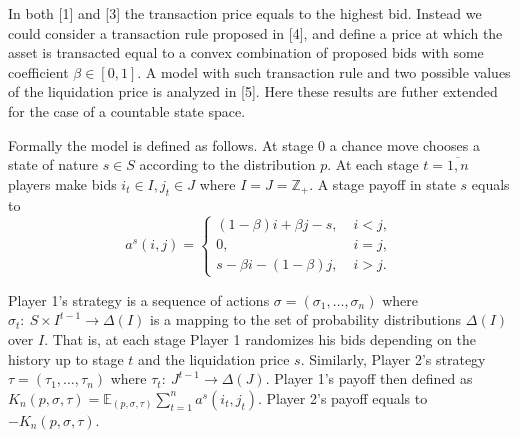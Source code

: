 In both [1] and [3] the transaction price equals to the highest bid. Instead we
could consider a transaction rule proposed in [4], and define a price at which
the asset is transacted equal to a convex combination of proposed bids with some
coefficient $\beta \in [0, 1]$. A model with such transaction rule and two
possible values of the liquidation price is analyzed in [5]. Here these results
are futher extended for the case of a countable state space.

Formally the model is defined as follows. At stage 0 a chance move chooses a
state of nature $s \in S$ according to the distribution $p$. At each
stage $t = \overline{1,n}$ players make bids $i_t \in I, j_t \in J$ where $I = J
= \mathbb{Z}_+$. A stage payoff in state $s$ equals to
\begin{equation*}
  a^s(i, j) =
  \begin{cases}
    (1-\beta) i + \beta j - s, &\; i < j,\\
    0, &\; i = j,\\
    s - \beta i - (1-\beta) j, &\; i > j.
  \end{cases}
\end{equation*}

Player 1's strategy is a sequence of actions $\sigma = (\sigma_1, \ldots,
\sigma_n)$ where $\sigma_t:~S \times I^{t-1} \rightarrow \Delta(I)$ is a mapping
to the set of probability distributions $\Delta(I)$ over $I$. That is, at each
stage Player 1 randomizes his bids depending on the history up to stage $t$ and
the liquidation price $s$. Similarly, Player 2's strategy $\tau = (\tau_1,
\ldots, \tau_n)$ where $\tau_t:~J^{t-1} \rightarrow \Delta(J)$. Player 1's
payoff then defined as $K_n(p, \sigma, \tau) = \mathbb{E}_{(p, \sigma, \tau)}
\sum_{t=1}^n a^s(i_t,j_t)$. Player 2's payoff equals to $-K_n(p, \sigma, \tau)$.

